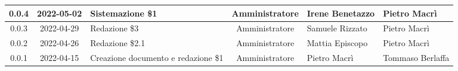 \begin{center}
\begin{longtable}{ |c|c|p{8em}|c|m{5em}|m{6em}| }
		\hline
		0.0.4 & 2022-05-02 & Sistemazione \$1 & Amministratore & Irene \newline Benetazzo & Pietro \newline Macrì\\
		\hline
		0.0.3 & 2022-04-29 & Redazione \$3 & Amministratore & Samuele \newline Rizzato & Pietro \newline Macrì\\
		\hline
		0.0.2 & 2022-04-26 & Redazione \$2.1 & Amministratore & Mattia \newline Episcopo & Pietro \newline Macrì\\
		\hline
		0.0.1 & 2022-04-15 & Creazione documento e redazione \$1 & Amministratore & Pietro \newline Macrì & Tommaso \newline Berlaffa\\
		\hline
	\end{longtable}
	\end{center}
	\newpage